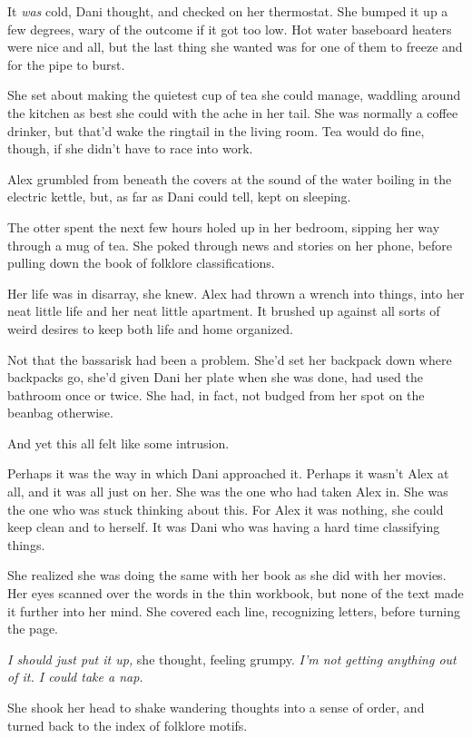 It \emph{was} cold, Dani thought, and checked on her thermostat. She bumped it up a few degrees, wary of the outcome if it got too low. Hot water baseboard heaters were nice and all, but the last thing she wanted was for one of them to freeze and for the pipe to burst.

She set about making the quietest cup of tea she could manage, waddling around the kitchen as best she could with the ache in her tail. She was normally a coffee drinker, but that'd wake the ringtail in the living room. Tea would do fine, though, if she didn't have to race into work.

Alex grumbled from beneath the covers at the sound of the water boiling in the electric kettle, but, as far as Dani could tell, kept on sleeping.

The otter spent the next few hours holed up in her bedroom, sipping her way through a mug of tea. She poked through news and stories on her phone, before pulling down the book of folklore classifications.

Her life was in disarray, she knew. Alex had thrown a wrench into things, into her neat little life and her neat little apartment. It brushed up against all sorts of weird desires to keep both life and home organized.

Not that the bassarisk had been a problem. She'd set her backpack down where backpacks go, she'd given Dani her plate when she was done, had used the bathroom once or twice. She had, in fact, not budged from her spot on the beanbag otherwise.

And yet this all felt like some intrusion.

Perhaps it was the way in which Dani approached it. Perhaps it wasn't Alex at all, and it was all just on her. She was the one who had taken Alex in. She was the one who was stuck thinking about this. For Alex it was nothing, she could keep clean and to herself. It was Dani who was having a hard time classifying things.

She realized she was doing the same with her book as she did with her movies. Her eyes scanned over the words in the thin workbook, but none of the text made it further into her mind. She covered each line, recognizing letters, before turning the page.

\emph{I should just put it up,} she thought, feeling grumpy. \emph{I'm not getting anything out of it. I could take a nap.}

She shook her head to shake wandering thoughts into a sense of order, and turned back to the index of folklore motifs.

